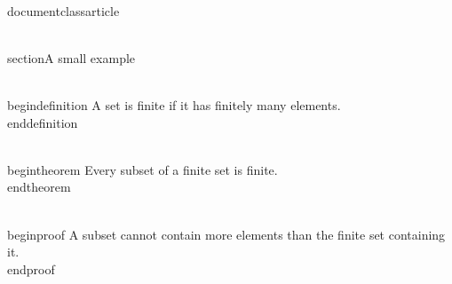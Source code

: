 \\documentclass{article}
\begin{document}
\\section{A small example}

\\begin{definition}
A set is finite if it has finitely many elements.
\\end{definition}

\\begin{theorem}
Every subset of a finite set is finite.
\\end{theorem}

\\begin{proof}
A subset cannot contain more elements than the finite set containing it.
\\end{proof}

\
\end{document}
